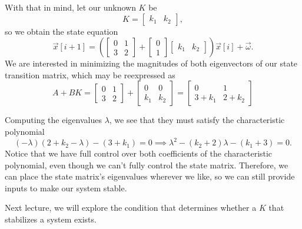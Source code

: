 \documentclass[letterpaper]{article}
\theoremstyle{remark}
\newcommand{\mat}[1]{\ensuremath{\begin{bmatrix}#1\end{bmatrix}}}
\begin{document}
With that in mind, let our unknown $K$ be
\[
    K = \mat{k_1 & k_2},
\]
so we obtain the state equation
\[
    \vec{x}[i + 1] = \left(\mat{ 0 & 1 \\ 3 & 2 } + \mat{0 \\ 1}\mat{k_1 & k_2}\right) \vec{x}[i] + \vec{\omega}.
\]
We are interested in minimizing the magnitudes of both eigenvectors of our state transition matrix, which may be reexpressed as
\[
    A + BK = \mat{0 & 1 \\ 3 & 2} + \mat{0 & 0 \\ k_1 & k_2} = \mat{0 & 1 \\ 3 + k_1 & 2 + k_2}
\]

Computing the eigenvalues $\lambda$, we see that they must satisfy the characteristic polynomial
\[
(-\lambda)(2 + k_2 - \lambda) - (3 + k_1) = 0 \implies \lambda^2 - (k_2 + 2)\lambda - (k_1+3) = 0.
\]
Notice that we have full control over both coefficients of the characteristic polynomial, even though we can't fully control the state matrix. Therefore, we can place the state matrix's eigenvalues wherever we like, so we can still provide inputs to make our system stable.

Next lecture, we will explore the condition that determines whether a $K$ that stabilizes a system exists.
\end{document}
